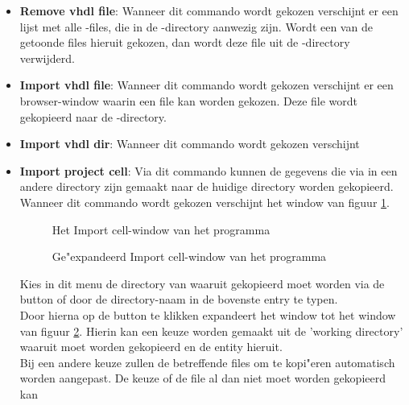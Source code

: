 \begin{itemize}
\item {\bf Remove vhdl file}: Wanneer dit commando wordt gekozen verschijnt
                       er een lijst met alle -files, die in de -directory
                       aanwezig zijn. Wordt een van de getoonde files
                       hieruit gekozen, dan wordt deze file uit de -directory
                       verwijderd.
\item {\bf Import vhdl file}: Wanneer dit commando wordt gekozen verschijnt
               er een browser-window waarin een file kan worden gekozen.
               Deze file wordt gekopieerd naar de -directory.
\item {\bf Import vhdl dir}: Wanneer dit commando wordt gekozen verschijnt
\item {\bf Import project cell}: Via dit commando kunnen de gegevens die via  in
                  een andere directory zijn gemaakt naar de huidige directory
                  worden gekopieerd.
                  Wanneer dit commando wordt gekozen verschijnt het window van
                  figuur \ref{copy-window}.
                  \begin{figure}[htb]
                  \centerline{}
                  \caption{Het Import cell-window van het programma }
                  \label{copy-window}
                  \end{figure}
                  \begin{figure}[htb]
                  \centerline{}
                  \caption{Ge"expandeerd Import cell-window van het programma }
                  \label{copy-window1}
                  \end{figure}
                  Kies in dit menu de directory van waaruit gekopieerd moet
                  worden via de  button of door de directory-naam in de
                  bovenste entry te typen.\\
                  Door hierna op de  button te klikken expandeert het window
                  tot het window van figuur \ref{copy-window1}.
                  Hierin kan een keuze worden gemaakt uit de 'working directory'
                  waaruit moet worden gekopieerd en de entity hieruit.\\
                  Bij een andere keuze zullen de betreffende files om te
                  kopi"eren automatisch worden aangepast.
                  De keuze of de file al dan niet moet worden gekopieerd kan

\end{itemize}

